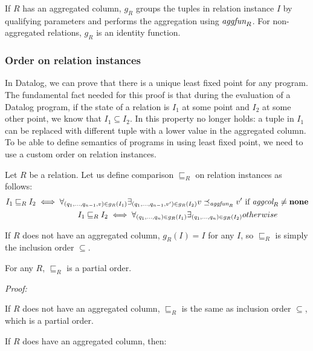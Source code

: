 If $R$ has an aggregated column, $g_R$ groups the tuples in relation instance $I$ by qualifying parameters and performs the aggregation using $\textit{aggfun}_R$. For non-aggregated relations, $g_R$ is an identity function.

\subsubsection{Order on relation instances}
In Datalog, we can prove that there is a unique least fixed point for any program. The fundamental fact needed for this proof is that during the evaluation of a Datalog program, if the state of a relation is $I_1$ at some point and $I_2$ at some other point, we know that $I_1 \subseteq I_2$. In \datalogra this property no longer holds: a tuple in $I_1$ can be replaced with different tuple with a lower value in the aggregated column. To be able to define semantics of programs in \datalogra using least fixed point, we need to use a custom order on relation instances.

\begin{defn}
Let $R$ be a relation. Let us define comparison $\sqsubseteq_R$ on relation instances as follows:
\begin{align}
I_1 \sqsubseteq_R I_2 \iff \forall_{(q_1, ..., q_{n-1}, v) \in g_R(I_1)} \exists_{(q_1, ..., q_{n-1}, v') \in g_R(I_2)} v \preceq_{\textit{aggfun}_R} v' & \text{ if } \textit{aggcol}_R \ne \bf{none} \\
I_1 \sqsubseteq_R I_2 \iff \forall_{(q_1, ..., q_n) \in g_R(I_1)} \exists_{(q_1, ..., q_n) \in g_R(I_2)} & otherwise
\end{align}
\end{defn}

\begin{note}
If $R$ does not have an aggregated column, $g_R(I) = I$ for any $I$, so $\sqsubseteq_R$ is simply the inclusion order $\subseteq$. 
\end{note}

\begin{lem}
For any $R$, $\sqsubseteq_R$ is a partial order.
\end{lem}

\emph{Proof:}

If $R$ does not have an aggregated column, $\sqsubseteq_R$ is the same as inclusion order $\subseteq$, which is a partial order.

If $R$ does have an aggregated column, then:

